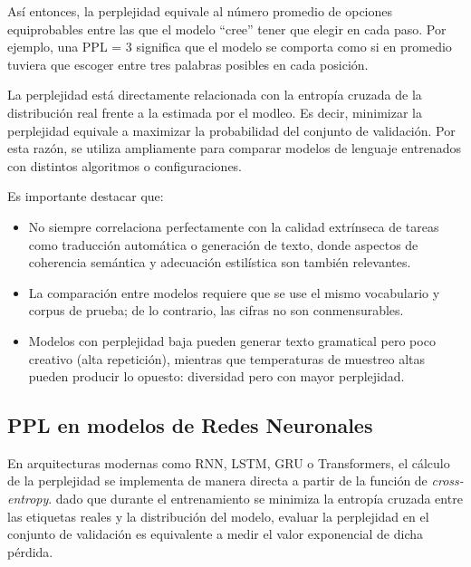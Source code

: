 Así entonces, la perplejidad equivale al número promedio de opciones equiprobables entre las
que el modelo ``cree'' tener que elegir en cada paso. Por ejemplo, una PPL = 3 significa que
el modelo se comporta como si en promedio tuviera que escoger entre tres palabras posibles
en cada posición.

La perplejidad está directamente relacionada con la entropía cruzada de la distribución
real frente a la estimada por el modleo. Es decir, minimizar la perplejidad equivale a 
maximizar la probabilidad del conjunto de validación. Por esta razón, se utiliza ampliamente
para comparar modelos de lenguaje entrenados con distintos algoritmos o configuraciones. 

Es importante destacar que:

\begin{itemize}
    \item No siempre correlaciona perfectamente con la calidad extrínseca de tareas como traducción automática o generación de texto, donde aspectos de coherencia semántica y adecuación estilística son también relevantes.
    \item La comparación entre modelos requiere que se use el mismo vocabulario y corpus de prueba; de lo contrario, las cifras no son conmensurables.
    \item Modelos con perplejidad baja pueden generar texto gramatical pero poco creativo (alta repetición), mientras que temperaturas de muestreo altas pueden producir lo opuesto: diversidad pero con mayor perplejidad.
\end{itemize}

\subsection{PPL en modelos de Redes Neuronales}

En arquitecturas modernas como RNN, LSTM, GRU o Transformers, el cálculo de la perplejidad se
implementa de manera directa a partir de la función de \textit{cross-entropy}. dado
que durante el entrenamiento se minimiza la entropía cruzada entre las etiquetas reales y la
distribución del modelo, evaluar la perplejidad en el conjunto de validación es equivalente a
medir el valor exponencial de dicha pérdida. 

